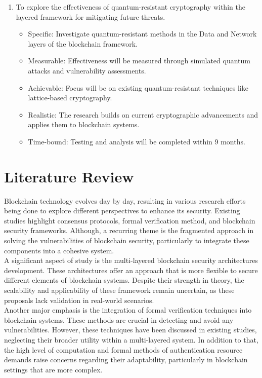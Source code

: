 \documentclass[a4paper, 12pt]{article}
\begin{document}
\begin{enumerate}
     \item To explore the effectiveness of quantum-resistant cryptography within the layered framework for mitigating future threats.
     \begin{itemize}
    \item Specific: Investigate quantum-resistant methods in the Data and Network layers of the blockchain framework.
    \item Measurable: Effectiveness will be measured through simulated quantum attacks and vulnerability assessments.
    \item Achievable: Focus will be on existing quantum-resistant techniques like lattice-based cryptography.
    \item Realistic: The research builds on current cryptographic advancements and applies them to blockchain systems.
    \item Time-bound: Testing and analysis will be completed within 9 months.
\end{itemize}
\end{enumerate}

\section{Literature Review}
Blockchain technology evolves day by day, resulting in various research efforts being done to explore different perspectives to enhance its security. Existing studies highlight consensus protocols, formal verification method, and blockchain security frameworks. Although, a recurring theme is the fragmented approach in solving the vulnerabilities of blockchain security, particularly to integrate these components into a cohesive system.\\

A significant aspect of study is the multi-layered blockchain security architectures development. These architectures offer an approach that is more flexible to secure different elements of blockchain systems. Despite their strength in theory, the scalability and applicability of these framework remain uncertain, as these proposals lack validation in real-world scenarios.\\

Another major emphasis is the integration of formal verification techniques into blockchain systems. These methods are crucial in detecting and avoid any vulnerabilities. However, these techniques have been discussed in existing studies, neglecting their broader utility within a multi-layered system. In addition to that, the high level of computation and formal methods of authentication resource demands raise concerns regarding their adaptability, particularly in blockchain settings that are more complex.\\
\end{document}

